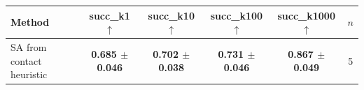 \begin{tabular}{lccccc}
\toprule
Method & succ\_k1 $\uparrow$ & succ\_k10 $\uparrow$ & succ\_k100 $\uparrow$ & succ\_k1000 $\uparrow$ & $n$ \\
\midrule
SA from contact heuristic & \textbf{0.685 $\pm$ 0.046} & \textbf{0.702 $\pm$ 0.038} & \textbf{0.731 $\pm$ 0.046} & \textbf{0.867 $\pm$ 0.049} & 5 \\
\bottomrule
\end{tabular}
